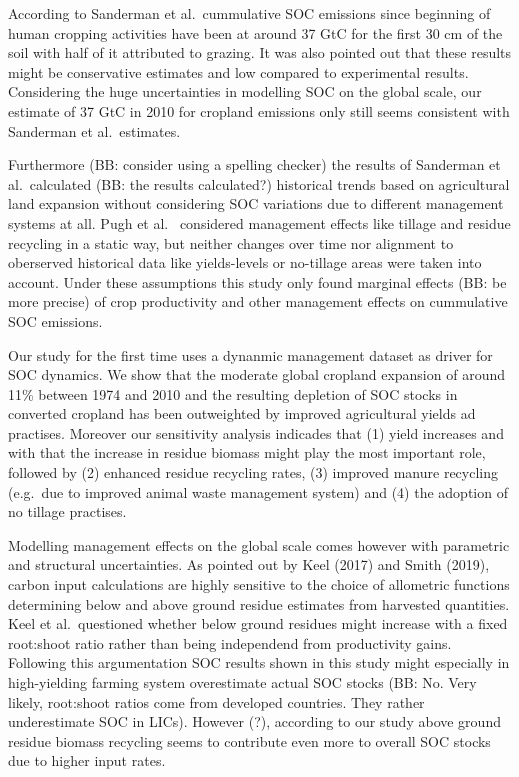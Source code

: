 \documentclass[gc, manuscript]{copernicus}
\begin{document}
According to Sanderman et al.~cummulative SOC emissions since beginning
of human cropping activities have been at around 37 GtC for the first 30
cm of the soil with half of it attributed to grazing. It was also
pointed out that these results might be conservative estimates and low
compared to experimental results. Considering the huge uncertainties in modelling SOC on the global scale, 
our estimate of 37 GtC in 2010 for cropland emissions only still seems consistent with Sanderman et al.~estimates.

Furthermore (BB: consider using a spelling checker) the results of Sanderman et al.~calculated (BB: the results calculated?) historical trends
based on agricultural land expansion without considering SOC variations
due to different management systems at all. Pugh et al.~ considered management
effects like tillage and residue recycling in a static way, but
neither changes over time nor alignment to oberserved historical data
like yields-levels or no-tillage areas were taken into account. Under
these assumptions this study only found marginal effects (BB: be more precise) of crop
productivity and other management effects on cummulative SOC emissions.

Our study for the first time uses a dynanmic management dataset as driver for SOC dynamics. We
show that the moderate global cropland expansion of around 11\% between 1974 and
2010 and the resulting depletion of SOC stocks in converted cropland has been outweighted by improved agricultural yields ad practises.
Moreover our sensitivity analysis indicades that (1) yield increases and
with that the increase in residue biomass might play the most important
role, followed by (2) enhanced residue recycling rates, (3) improved
manure recycling (e.g.~due to improved animal waste management system)
and (4) the adoption of no tillage practises.

Modelling management effects on the global scale comes however with 
parametric and structural uncertainties. As pointed out by Keel
(2017) and Smith (2019), carbon input
calculations are highly sensitive to the choice of allometric functions
determining below and above ground residue estimates from harvested
quantities. Keel et al.~questioned whether below ground residues might
increase with a fixed root:shoot ratio rather than being independend from
productivity gains. Following this argumentation SOC results shown in
this study might especially in high-yielding farming system overestimate
actual SOC stocks (BB: No. Very likely, root:shoot ratios come from developed countries. They rather underestimate SOC in LICs). However (?), according to our study above ground residue biomass recycling seems to contribute even more to overall SOC stocks due
to higher input rates.
\end{document}
